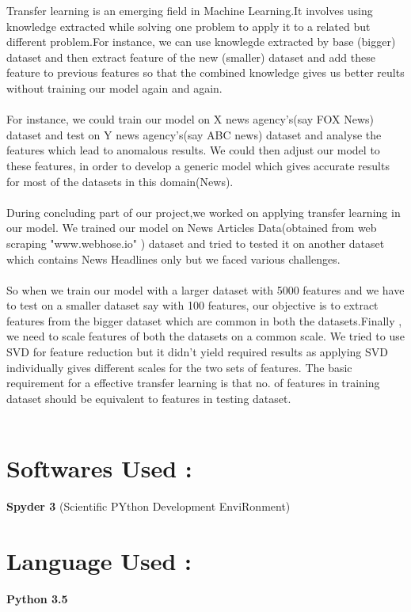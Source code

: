 \documentclass{report}
\begin{document}
Transfer learning is an emerging field in Machine Learning.It involves using knowledge extracted while solving one problem to apply it to a related but different problem.For instance, we can use knowlegde extracted by base (bigger) dataset and then extract feature of the new (smaller) dataset and add these feature to previous features so that the combined knowledge gives us better reults without training our model again and again.\\ \\
For instance, we could train our model on X news agency's(say FOX News) dataset and test on Y news agency's(say ABC news) dataset and analyse the features which lead to anomalous results. We could then adjust our model to these features, in order to develop a generic model which gives accurate results for most of the datasets in this domain(News).\\ \\During concluding part of our project,we worked on applying transfer learning in our model. We trained our model on  News Articles Data(obtained from web scraping "www.webhose.io" )  dataset and tried to tested it on another dataset which contains News Headlines only but we faced various challenges.\\ \\
So when we train our model with a larger dataset with 5000 features and we have to test on a smaller dataset say with 100 features, our objective is to extract features from the bigger dataset which are common in both the datasets.Finally , we need to scale features of both the datasets on a common scale. We tried to use SVD for feature reduction but it didn't yield required results as applying SVD individually gives different scales for the two sets of features.
The basic requirement for a effective transfer learning is that no. of features in training dataset should be equivalent to features in testing dataset.\\ \\

\pagebreak
\section{\huge Softwares Used :}
\textbf{Spyder 3} (Scientific PYthon Development EnviRonment)
\section{\huge Language Used :}
\textbf{Python 3.5}
\end{document}

